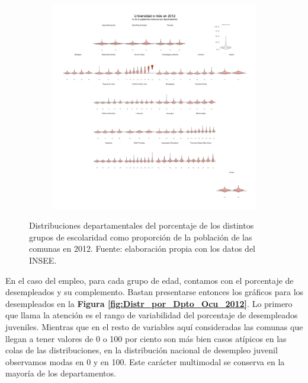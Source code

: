 \begin{figure}[h]
\begin{subfigure}{0.3\textwidth}
	\end{subfigure}
	~
	\begin{subfigure}{0.3\textwidth}
	\includegraphics[width = \textwidth]{Figs/AED/Geofacet_Distr_por_Dpto_Dip4_2012}
	\end{subfigure}
	\caption{Distribuciones departamentales del porcentaje de los distintos grupos de escolaridad como proporción de la población de las comunas en 2012. Fuente: elaboración propia con los datos del INSEE.}
	\label{fig:Distr_por_Dpto_Esc_2012}	
\end{figure}

En el caso del empleo, para cada grupo de edad, contamos con el porcentaje de desempleados y su complemento. Bastan presentarse entonces los gráficos para los desempleados en la \textbf{Figura \ref{fig:Distr_por_Dpto_Ocu_2012}}. Lo primero que llama la atención es el rango de variabilidad del porcentaje de desempleados juveniles. Mientras que en el resto de variables aquí consideradas las comunas que llegan a tener valores de 0 o 100 por ciento son más bien casos atípicos en las colas de las distribuciones, en la distribución nacional de desempleo juvenil observamos modas en 0 y en 100. Este carácter multimodal se conserva en la mayoría de los departamentos.\\ 

